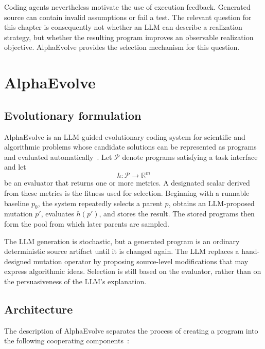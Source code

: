 Coding agents nevertheless motivate the use of execution feedback. Generated
source can contain invalid assumptions or fail a test. 
The relevant question for this chapter is consequently not
whether an LLM can describe a realization strategy, but whether the resulting
program improves an observable realization objective. AlphaEvolve provides the
selection mechanism for this question.

\section{AlphaEvolve}
\label{sec:alphaevolve}

\subsection{Evolutionary formulation}

AlphaEvolve is an LLM-guided evolutionary coding system for scientific and
algorithmic problems whose candidate solutions can be represented as programs
and evaluated automatically~\cite{novikov2025alphaevolve}. Let $\mathcal{P}$
denote programs satisfying a task interface and let
\begin{equation}
    h : \mathcal{P} \longrightarrow \mathbb{R}^{m}
\end{equation}
be an evaluator that returns one or more metrics. A designated scalar derived
from these metrics is the fitness used for selection. Beginning with a runnable
baseline $p_0$, the system repeatedly selects a parent $p$, obtains an
LLM-proposed mutation $p'$, evaluates $h(p')$, and stores the result. The stored
programs then form the pool from which later parents are sampled.

The LLM generation is stochastic,
but a generated program is an ordinary deterministic source artifact until it
is changed again. The LLM replaces a hand-designed mutation operator by proposing
source-level modifications that may express algorithmic ideas. Selection is
still based on the evaluator, rather than on the persuasiveness of the LLM's
explanation.

\subsection{Architecture}

The description of AlphaEvolve separates the process of creating a program into the
following cooperating components~\cite{novikov2025alphaevolve}:

